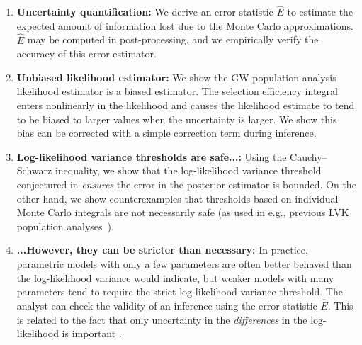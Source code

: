 \begin{enumerate}
    \item \textbf{Uncertainty quantification:} We derive an error statistic $\hat{E}$ to estimate the expected amount of information lost due to the Monte Carlo approximations. $\hat{E}$ may be computed in post-processing, and we empirically verify the accuracy of this error estimator.
    \item \textbf{Unbiased likelihood estimator:} We show the \ac{GW} population analysis likelihood estimator is a biased estimator. The selection efficiency integral enters nonlinearly in the likelihood and causes the likelihood estimate to tend to be biased to larger values when the uncertainty is larger. We show this bias can be corrected with a simple correction term during inference.
    \item \textbf{Log-likelihood variance thresholds are safe...:} Using the Cauchy--Schwarz inequality, we show that the log-likelihood variance threshold conjectured in \citet{Talbot:2023pex} \textit{ensures} the error in the posterior estimator is bounded. On the other hand, we show counterexamples that thresholds based on individual Monte Carlo integrals are not necessarily safe (as used in e.g., previous \ac{LVK} population analyses~\cite{KAGRA:2021duu}).
    \item \textbf{...However, they can be stricter than necessary:} In practice, parametric models with only a few parameters are often better behaved than the log-likelihood variance would indicate, but weaker models with many parameters tend to require the strict log-likelihood variance threshold. The analyst can check the validity of an inference using the error statistic $\hat{E}$. This is related to the fact that only uncertainty in the \textit{differences} in the log-likelihood is important \citep{Farr:2019rap, Essick:2022ojx, Talbot:2023pex}.
\end{enumerate}

